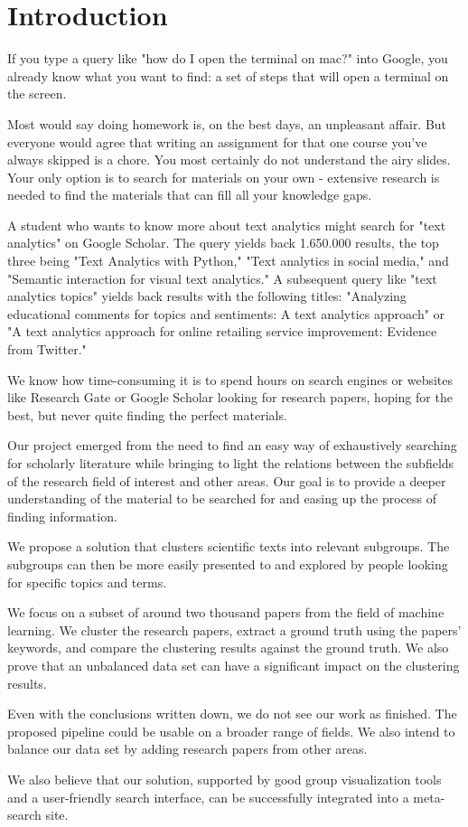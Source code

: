 \section{Introduction}

If you type a query like "how do I open the terminal on mac?" into Google, you already know what you want to find: a set of steps that will open a terminal on the screen.

Most would say doing homework is, on the best days, an unpleasant affair. But everyone would agree that writing an assignment for that one course you've always skipped is a chore. You most certainly do not understand the airy slides. Your only option is to search for materials on your own - extensive research is needed to find the materials that can fill all your knowledge gaps.

A student who wants to know more about text analytics might search for "text analytics" on Google Scholar. The query yields back 1.650.000 results, the top three being "Text Analytics with Python," "Text analytics in social media," and "Semantic interaction for visual text analytics." A subsequent query like "text analytics topics" yields back results with the following titles: "Analyzing educational comments for topics and sentiments: A text analytics approach" or "A text analytics approach for online retailing service improvement: Evidence from Twitter."

We know how time-consuming it is to spend hours on search engines or websites like Research Gate or Google Scholar looking for research papers, hoping for the best, but never quite finding the perfect materials.

Our project emerged from the need to find an easy way of exhaustively searching for scholarly literature while bringing to light the relations between the subfields of the research field of interest and other areas. Our goal is to provide a deeper understanding of the material to be searched for and easing up the process of finding information.

We propose a solution that clusters scientific texts into relevant subgroups. The subgroups can then be more easily presented to and explored by people looking for specific topics and terms.

We focus on a subset of around two thousand papers from the field of machine learning. We cluster the research papers, extract a ground truth using the papers' keywords, and compare the clustering results against the ground truth. We also prove that an unbalanced data set can have a significant impact on the clustering results. 

Even with the conclusions written down, we do not see our work as finished. The proposed pipeline could be usable on a broader range of fields. We also intend to balance our data set by adding research papers from other areas.

We also believe that our solution, supported by good group visualization tools and a user-friendly search interface, can be successfully integrated into a meta-search site.